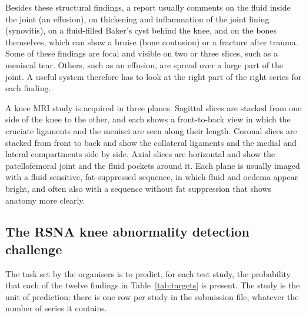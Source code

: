 Besides these structural findings, a report usually comments on the fluid inside the joint (an effusion), on thickening and inflammation of the joint lining (synovitis), on a fluid-filled Baker's cyst behind the knee, and on the bones themselves, which can show a bruise (bone contusion) or a fracture after trauma. Some of these findings are focal and visible on two or three slices, such as a meniscal tear. Others, such as an effusion, are spread over a large part of the joint. A useful system therefore has to look at the right part of the right series for each finding.

A knee MRI study is acquired in three planes. Sagittal slices are stacked from one side of the knee to the other, and each shows a front-to-back view in which the cruciate ligaments and the menisci are seen along their length. Coronal slices are stacked from front to back and show the collateral ligaments and the medial and lateral compartments side by side. Axial slices are horizontal and show the patellofemoral joint and the fluid pockets around it. Each plane is usually imaged with a fluid-sensitive, fat-suppressed sequence, in which fluid and oedema appear bright, and often also with a sequence without fat suppression that shows anatomy more clearly.

\subsection{The RSNA knee abnormality detection challenge}

The task set by the organisers is to predict, for each test study, the probability that each of the twelve findings in Table~\ref{tab:targets} is present. The study is the unit of prediction: there is one row per study in the submission file, whatever the number of series it contains.

